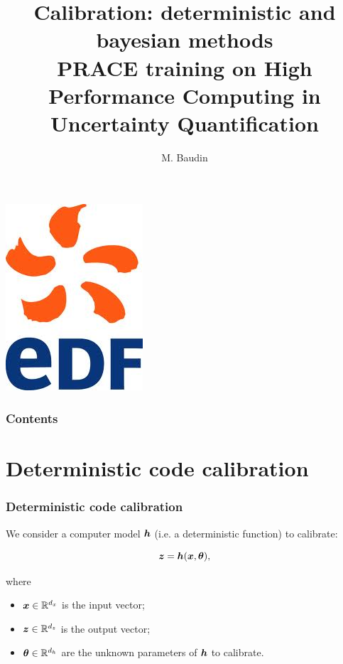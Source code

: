 \documentclass{beamer}
\title[PRACE/UQ: Calibration]{
Calibration: deterministic and bayesian methods \\
PRACE training on High Performance Computing in Uncertainty Quantification 
}
\author[Baudin]{
M. Baudin
}
\begin{document}

  \begin{frame}
  \titlepage
  
  \begin{center}
\includegraphics[height=0.15\textheight]{figures/edf.jpg}
\end{center}

  \end{frame}


\begin{frame}
\frametitle{Contents}
\tableofcontents
\end{frame}

\section{Deterministic code calibration}


\begin{frame}
\frametitle{Deterministic code calibration}

We consider a computer model $\boldsymbol{h}$ (i.e. a deterministic
function) to calibrate:

$$
       \boldsymbol{z} = \boldsymbol{h}(\boldsymbol{x}, \boldsymbol{\theta}),
$$

where

\begin{itemize}
\item  $\boldsymbol{x} \in \mathbb{R}^{d_x}$ is the input vector;
\item  $\boldsymbol{z} \in \mathbb{R}^{d_z}$ is the output vector;
\item  $\boldsymbol{\theta} \in \mathbb{R}^{d_h}$ are the unknown parameters of
   $\boldsymbol{h}$ to calibrate.
\end{itemize}

\end{frame}
\end{document}

